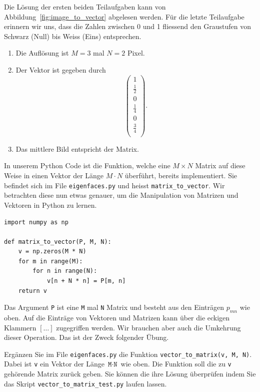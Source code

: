 \begin{losung*}
	Die Lösung der ersten beiden Teilaufgaben kann von Abbildung~\ref{fig:image_to_vector} abgelesen werden.
	Für die letzte Teilaufgabe erinnern wir uns, dass die Zahlen zwischen 0 und 1 fliessend den Graustufen von Schwarz (Null) bis Weiss (Eins) entsprechen.
	\begin{enumerate}[label=(\alph*)]
		\item Die Auflösung ist $M=3$ mal $N=2$ Pixel.
		\item Der Vektor ist gegeben durch
		\begin{equation*}
			\begin{pmatrix}
				1 \\
				\frac{1}{2} \\
				0 \\
				\frac{1}{4} \\
				0 \\
				\frac{3}{4} \\
			\end{pmatrix}.
		\end{equation*}
		\item Das mittlere Bild entspricht der Matrix.
	\end{enumerate}
\end{losung*}
In unserem Python Code ist die Funktion, welche eine $M\times N$ Matrix auf diese Weise in einen Vektor der Länge $M\cdot N$ überführt, bereits implementiert.
Sie befindet sich im File \texttt{eigenfaces.py} und heisst \texttt{matrix\_to\_vector}.
Wir betrachten diese nun etwas genauer, um die Manipulation von Matrizen und Vektoren in Python zu lernen.
\begin{lstlisting}[style=python]
import numpy as np

def matrix_to_vector(P, M, N):
	v = np.zeros(M * N)
	for m in range(M):
		for n in range(N):
			v[n + N * n] = P[m, n]
	return v
\end{lstlisting}
Das Argument \texttt{P} ist eine \texttt{M} mal \texttt{N} Matrix und besteht aus den Einträgen $p_{mn}$ wie oben.
Auf die Einträge von Vektoren und Matrizen kann über die eckigen Klammern $[\ldots]$ zugegriffen werden.
Wir brauchen aber auch die Umkehrung dieser Operation.
Das ist der Zweck folgender Übung.
\begin{aufgabe} \label{aufg:vectormatrix_code}
	Ergänzen Sie im File \texttt{eigenfaces.py} die Funktion \texttt{vector\_to\_matrix(v, M, N)}.
	Dabei ist \texttt{v} ein Vektor der Länge $\texttt{M}\cdot\texttt{N}$ wie oben.
	Die Funktion soll die zu \texttt{v} gehörende Matrix zurück geben.
	Sie können die ihre Lösung überprüfen indem Sie das Skript \texttt{vector\_to\_matrix\_test.py} laufen lassen.
\end{aufgabe}
